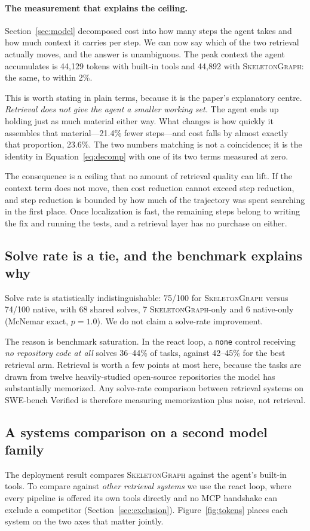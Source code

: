 \documentclass[11pt,letterpaper]{article}
\newcommand{\sg}{\textsc{SkeletonGraph}}
\begin{document}
\paragraph{The measurement that explains the ceiling.}
Section~\ref{sec:model} decomposed cost into how many steps the agent takes and
how much context it carries per step. We can now say which of the two retrieval
actually moves, and the answer is unambiguous. The peak context the agent
accumulates is 44{,}129 tokens with built-in tools and 44{,}892 with \sg{}: the
same, to within 2\%.

This is worth stating in plain terms, because it is the paper's explanatory
centre. \emph{Retrieval does not give the agent a smaller working set.} The agent
ends up holding just as much material either way. What changes is how quickly it
assembles that material---21.4\% fewer steps---and cost falls by almost exactly
that proportion, 23.6\%. The two numbers matching is not a coincidence; it is the
identity in Equation~\eqref{eq:decomp} with one of its two terms measured at zero.

The consequence is a ceiling that no amount of retrieval quality can lift. If the
context term does not move, then cost reduction cannot exceed step reduction, and
step reduction is bounded by how much of the trajectory was spent searching in the
first place. Once localization is fast, the remaining steps belong to writing the
fix and running the tests, and a retrieval layer has no purchase on either.

\subsection{Solve rate is a tie, and the benchmark explains why}
\label{sec:saturation}
Solve rate is statistically indistinguishable: 75/100 for \sg{} versus 74/100
native, with 68 shared solves, 7 \sg{}-only and 6 native-only (McNemar exact,
$p=1.0$). We do not claim a solve-rate improvement.

The reason is benchmark saturation. In the react loop, a \texttt{none} control
receiving \emph{no repository code at all} solves 36--44\% of tasks, against
42--45\% for the best retrieval arm. Retrieval is worth a few points at most
here, because the tasks are drawn from twelve heavily-studied open-source
repositories the model has substantially memorized. Any solve-rate comparison
between retrieval systems on SWE-bench Verified is therefore measuring
memorization plus noise, not retrieval.

\subsection{A systems comparison on a second model family}
\label{sec:systems}
The deployment result compares \sg{} against the agent's built-in tools. To compare against
\emph{other retrieval systems} we use the react loop, where every pipeline is
offered its own tools directly and no MCP handshake can exclude a competitor
(Section~\ref{sec:exclusion}). Figure~\ref{fig:tokens} places each system on the
two axes that matter jointly.
\end{document}
